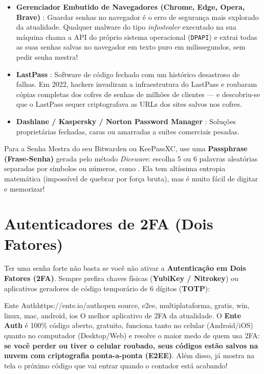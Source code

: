 \documentclass{pousadaguide}
\begin{document}
\begin{perigo}
\begin{itemize}
  \item \textbf{Gerenciador Embutido de Navegadores (Chrome, Edge, Opera, Brave)} : Guardar senhas no navegador é o erro de segurança mais explorado da atualidade. Qualquer malware do tipo \emph{infostealer} executado na sua máquina chama a API do próprio sistema operacional (\texttt{DPAPI}) e extrai todas as suas senhas salvas no navegador em texto puro em milissegundos, sem pedir senha mestra!
  \item \textbf{LastPass} : Software de código fechado com um histórico desastroso de falhas. Em 2022, hackers invadiram a infraestrutura do LastPass e roubaram cópias completas dos cofres de senhas de milhões de clientes — e descobriu-se que o LastPass sequer criptografava as URLs dos sites salvos nos cofres.
  \item \textbf{Dashlane / Kaspersky / Norton Password Manager} : Soluções proprietárias fechadas, caras ou amarradas a suítes comerciais pesadas.
\end{itemize}
\end{perigo}

\begin{dica}
Para a Senha Mestra do seu Bitwarden ou KeePassXC, use uma \textbf{Passphrase (Frase-Senha)} gerada pelo método \emph{Diceware}: escolha 5 ou 6 palavras aleatórias separadas por símbolos ou números, como . Ela tem altíssima entropia matemática (impossível de quebrar por força bruta), mas é muito fácil de digitar e memorizar!
\end{dica}

\section{Autenticadores de 2FA (Dois Fatores)}

Ter uma senha forte não basta se você não ativar a \textbf{Autenticação em Dois Fatores (2FA)}. Sempre prefira chaves físicas (\textbf{YubiKey / Nitrokey}) ou aplicativos geradores de código temporário de 6 dígitos (\textbf{TOTP}):

\begin{ferramenta}[goat,logo=ente]{Ente Auth}{https://ente.io/auth}{open source, e2ee, multiplataforma, gratis, win, linux, mac, android, ios}
O melhor aplicativo de 2FA da atualidade. O \textbf{Ente Auth} é 100\% código aberto, gratuito, funciona tanto no celular (Android/iOS) quanto no computador (Desktop/Web) e resolve o maior medo de quem usa 2FA: \textbf{se você perder ou tiver o celular roubado, seus códigos estão salvos na nuvem com criptografia ponta-a-ponta (E2EE)}. Além disso, já mostra na tela o próximo código que vai entrar quando o contador está acabando! 
\end{ferramenta}
\end{document}

